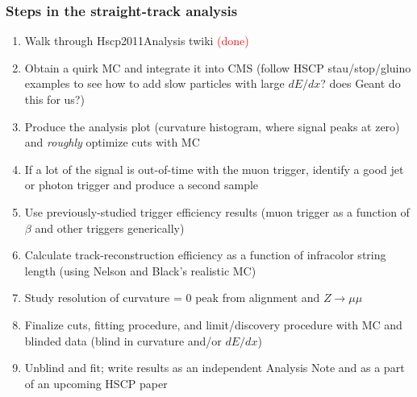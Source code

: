 \documentclass[compress]{beamer}
\begin{document}
\begin{frame}
\frametitle{Steps in the straight-track analysis}
\begin{enumerate}
\item Walk through Hscp2011Analysis twiki \hfill \textcolor{red}{(done)}

\item Obtain a quirk MC and integrate it into CMS (follow HSCP stau/stop/gluino examples to see how to add slow particles with large $dE/dx$? does Geant do this for us?)

\item Produce the analysis plot (curvature histogram, where signal peaks at zero) and {\it roughly} optimize cuts with MC

\item If a lot of the signal is out-of-time with the muon trigger, identify a good jet or photon trigger and produce a second sample

\item Use previously-studied trigger efficiency results (muon trigger as a function of $\beta$ and other triggers generically)

\item Calculate track-reconstruction efficiency as a function of infracolor string length (using Nelson and Black's realistic MC)

\item Study resolution of curvature = 0 peak from alignment and $Z \to \mu\mu$

\item Finalize cuts, fitting procedure, and limit/discovery procedure with MC and blinded data (blind in curvature and/or $dE/dx$)

\item Unblind and fit; write results as an independent Analysis Note and as a part of an upcoming HSCP paper
\end{enumerate}
\end{frame}


\end{document}
